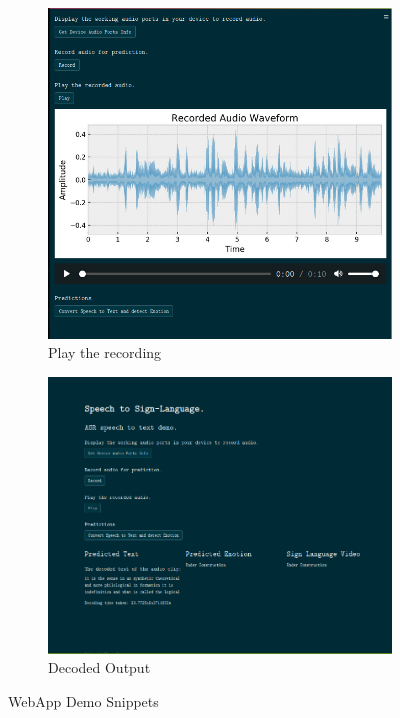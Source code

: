 \documentclass[14pt,a4paper]{article}
\begin{document}
\begin{figure}
\begin{subfigure}[b]{0.3\textwidth}
    \includegraphics[width=\textwidth]{../images/streamlit_app2.png}
    \caption{Play the recording}
    \end{subfigure}
    \begin{subfigure}[b]{0.35\textwidth}
    \includegraphics[width=\textwidth]{../images/streamlit_app3.png}
    \caption{Decoded Output}
    \end{subfigure}
    \label{fig:WebApp}
    \caption{WebApp Demo Snippets}
\end{figure}
\end{document}
